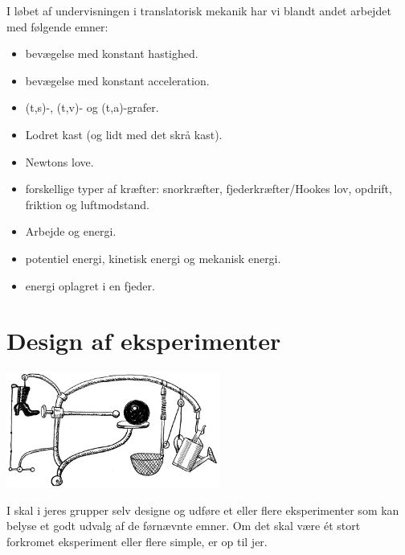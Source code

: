 \documentclass[a4paper, 12pt]{article}
\begin{document}
I løbet af undervisningen i translatorisk mekanik har vi blandt andet arbejdet med følgende emner:
\begin{itemize}
\item bevægelse med konstant hastighed.
\item bevægelse med konstant acceleration.
\item (t,s)-, (t,v)- og (t,a)-grafer.
\item Lodret kast (og lidt med det skrå kast).
\item Newtons love.
\item forskellige typer af kræfter: snorkræfter, fjederkræfter/Hookes lov, opdrift, friktion og luftmodstand.
\item Arbejde og energi.
\item potentiel energi, kinetisk energi og mekanisk energi.
\item energi oplagret i en fjeder.
\end{itemize}

\newpage

\section*{Design af eksperimenter}
\label{sec:orgffcc7ef}
\begin{center}
\includegraphics[width=7cm]{img/2019-12-10_07-37-00_vandekandedimstilweb2.jpg}
\end{center}

I skal i jeres grupper selv designe og udføre et eller flere eksperimenter som kan belyse et godt udvalg af de førnævnte emner. Om det skal være ét stort forkromet eksperiment eller flere simple, er op til jer.
\end{document}
